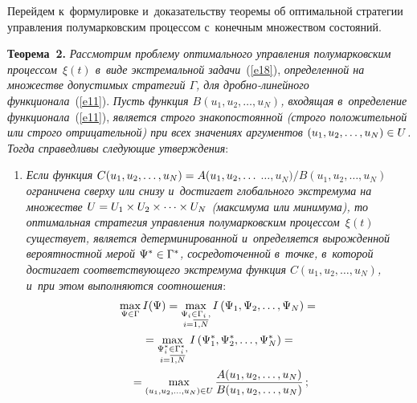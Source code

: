 \begin{multicols}{2}
Перейдем к~формулировке и~доказательству тео\-ре\-мы об 
оптимальной стратегии управ\-ле\-ния полумарковским процессом с~конечным 
множеством состояний.

\smallskip

\noindent
\textbf{Теорема~2.} \textit{Рассмотрим проблему оптимального управ\-ле\-ния 
полумарковским процессом~$\xi(t)$ в~виде экстремальной задачи}~(\ref{e18}), 
\textit{определенной на множестве допустимых стратегий $\Gamma$, 
для дроб\-но-ли\-ней\-но\-го 
функционала}~(\ref{e11}). \textit{Пусть функция $B(u_1,u_2,\ldots,u_N)$, 
входящая в~определение функционала}~(\ref{e11}),
\textit{является строго знакопостоянной (строго положительной или строго отрицательной) 
при всех значениях аргументов $(u_1,u_2,\ldots,u_N)\hm\in U$.
Тогда справедливы сле\-ду\-ющие утверждения}:
\begin{enumerate}[1.]
\item \textit{Если функция} $C(u_1,u_2,\ldots,u_N)\hm=A(u_1,u_2,\ldots$\linebreak
$\ldots,u_N)/{B(u_1,u_2,\ldots,u_N)}$ 
\textit{ограничена сверху или снизу и~достигает глобального экст\-ре\-му\-ма на множестве
$U\hm=U_1\times U_2\times \cdots \times U_N$ (максимума или минимума), 
то оптимальная стратегия управления полумарковским процессом~$\xi(t)$ существует, 
является детерминированной и~определяется
вырожденной вероятностной мерой $\Psi^*\hm\in \Gamma^*$, сосредоточенной в~точке, 
в~которой достига\-ет соответствующего экстремума функция $C(u_1,u_2,\ldots,u_N)$,
и~при этом выполняются соотношения}:
\begin{multline}  %
\max\limits_{\Psi \in \Gamma} I(\Psi)=
\max\limits_{\substack{{\Psi_i \in \Gamma_i\,,}\\ 
{i=\overline{1,N}}}}
I\left(\Psi_1,\Psi_2,\ldots,\Psi_N\right)={}\\
{}=
\max\limits_{\substack{{\Psi_i^* \in \Gamma_i^*,}\\ 
{i=\overline{1,N}}}}
 I\left(\Psi_1^*,\Psi_2^*,\ldots,\Psi_N^*\right)={}\\
{}=\max\limits_{(u_1,u_2,\ldots,u_N)\in U}\fr{A(u_1,u_2,\ldots,u_N)}
{B(u_1,u_2,\ldots,u_N)}\,; \label{e19}
\end{multline}

\vspace*{-12pt}


\end{enumerate}
\end{multicols}
